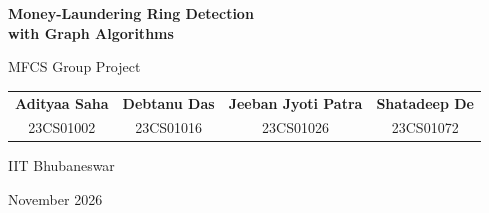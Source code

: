 \documentclass[aspectratio=169,11pt]{beamer}
\begin{document}
\begin{frame}[plain]
\centering
\vspace*{1.0cm}
{\LARGE\bfseries\color{accent} Money-Laundering Ring Detection\\[0.2cm] with Graph Algorithms\par}
\vspace{0.35cm}
{\large\color{accent} MFCS Group Project\par}

\vspace{0.9cm}
{\normalsize
\begin{tabular}{cccc}
\textbf{Adityaa Saha} & \textbf{Debtanu Das} & \textbf{Jeeban Jyoti Patra} & \textbf{Shatadeep De} \\
{\footnotesize\color{graytext}23CS01002} & {\footnotesize\color{graytext}23CS01016} & {\footnotesize\color{graytext}23CS01026} & {\footnotesize\color{graytext}23CS01072}
\end{tabular}
\par}

\vspace{0.8cm}
{\small IIT Bhubaneswar\par}
\vspace{0.3cm}
{\normalsize November 2026\par}
\end{frame}
\end{document}
